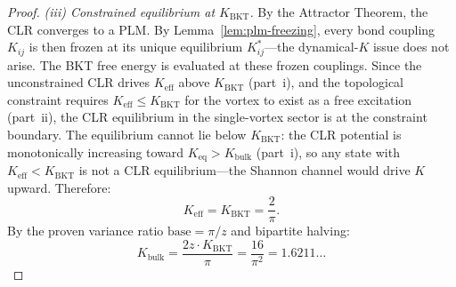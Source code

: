 \documentclass[aps,prd,onecolumn,superscriptaddress,floatfix,12pt]{revtex4-2}
\newcommand{\Kbulk}{K_{\text{bulk}}}
\newcommand{\KBKT}{K_{\text{BKT}}}
\begin{document}
\begin{proof}
\emph{(iii) Constrained equilibrium at $\KBKT$.}
By the Attractor Theorem, the CLR converges to a PLM. By Lemma~\ref{lem:plm-freezing}, every bond coupling $K_{ij}$ is then frozen at its unique equilibrium $K^*_{ij}$---the dynamical-$K$ issue does not arise. The BKT free energy is evaluated at these frozen couplings. Since the unconstrained CLR drives $K_{\text{eff}}$ above $\KBKT$ (part~i), and the topological constraint requires $K_{\text{eff}} \le \KBKT$ for the vortex to exist as a free excitation (part~ii), the CLR equilibrium in the single-vortex sector is at the constraint boundary. The equilibrium cannot lie below $\KBKT$: the CLR potential is monotonically increasing toward $K_{\text{eq}} > \Kbulk$ (part~i), so any state with $K_{\text{eff}} < \KBKT$ is not a CLR equilibrium---the Shannon channel would drive $K$ upward. Therefore:
\begin{equation}
K_{\text{eff}} = \KBKT = \frac{2}{\pi}.
\end{equation}
By the proven variance ratio $\text{base} = \pi/z$ and bipartite halving:
\begin{equation}
\Kbulk = \frac{2z \cdot \KBKT}{\pi} = \frac{16}{\pi^2} = 1.6211\ldots
\end{equation}
\end{proof}
\end{document}
